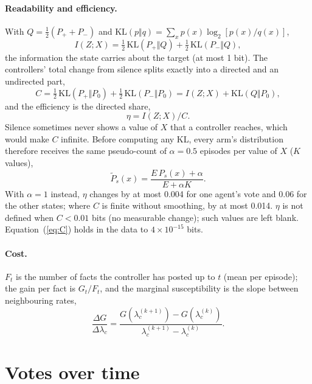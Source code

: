 \documentclass[10pt,a4paper]{article}
\begin{document}
\paragraph{Readability and efficiency.} With $Q = \frac12(P_+ + P_-)$ and $\mathrm{KL}(p\Vert q) = \sum_x p(x)\log_2[p(x)/q(x)]$,
\begin{equation}\label{eq:I}
I(Z;X) = \tfrac12\,\mathrm{KL}(P_+\Vert Q) + \tfrac12\,\mathrm{KL}(P_-\Vert Q),
\end{equation}
the information the state carries about the target (at most 1 bit). The controllers' total change from silence
splits exactly into a directed and an undirected part,
\begin{equation}\label{eq:C}
C = \tfrac12\,\mathrm{KL}(P_+\Vert P_0) + \tfrac12\,\mathrm{KL}(P_-\Vert P_0) = I(Z;X) + \mathrm{KL}(Q\Vert P_0),
\end{equation}
and the efficiency is the directed share,
\begin{equation}\label{eq:eta}
\eta = I(Z;X)/C .
\end{equation}
Silence sometimes never shows a value of $X$ that a controller reaches, which would make $C$ infinite. Before
computing any KL, every arm's distribution therefore receives the same pseudo-count of $\alpha = 0.5$ episodes per
value of $X$ ($K$ values),
\begin{equation}\label{eq:smooth}
\tilde P_s(x) = \frac{E\,P_s(x) + \alpha}{E + \alpha K}.
\end{equation}
With $\alpha = 1$ instead, $\eta$ changes by at most 0.004 for one agent's vote and 0.06 for the other states; where
$C$ is finite without smoothing, by at most 0.014. $\eta$ is not defined when $C < 0.01$ bits (no measurable change);
such values are left blank. Equation~(\ref{eq:C}) holds in the data to $4\times10^{-15}$ bits.

\paragraph{Cost.} $F_t$ is the number of facts the controller has posted up to $t$ (mean per episode); the gain
per fact is $G_t/F_t$, and the marginal susceptibility is the slope between neighbouring rates,
\begin{equation}\label{eq:slope}
\frac{\Delta G}{\Delta\lambda_c} = \frac{G(\lambda_c^{(k+1)}) - G(\lambda_c^{(k)})}{\lambda_c^{(k+1)} - \lambda_c^{(k)}} .
\end{equation}

\section{Votes over time}
\end{document}
